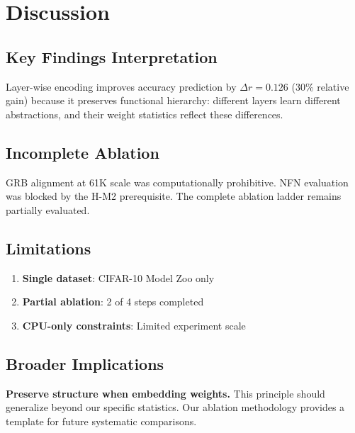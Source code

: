 \section{Discussion}

\subsection{Key Findings Interpretation}

Layer-wise encoding improves accuracy prediction by $\Delta r = 0.126$ (30\% relative gain) because it preserves functional hierarchy: different layers learn different abstractions, and their weight statistics reflect these differences.

\subsection{Incomplete Ablation}

GRB alignment at 61K scale was computationally prohibitive. NFN evaluation was blocked by the H-M2 prerequisite. The complete ablation ladder remains partially evaluated.

\subsection{Limitations}

\begin{enumerate}
    \item \textbf{Single dataset}: CIFAR-10 Model Zoo only
    \item \textbf{Partial ablation}: 2 of 4 steps completed
    \item \textbf{CPU-only constraints}: Limited experiment scale
\end{enumerate}

\subsection{Broader Implications}

\textbf{Preserve structure when embedding weights.} This principle should generalize beyond our specific statistics. Our ablation methodology provides a template for future systematic comparisons.
